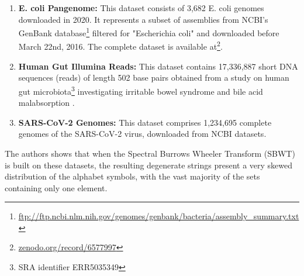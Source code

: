 \begin{enumerate}
    \item \textbf{E. coli Pangenome:} This dataset consists of 3,682 E. coli genomes downloaded in 2020. It represents a subset of assemblies from NCBI's GenBank database\footnote{\url{ftp://ftp.ncbi.nlm.nih.gov/genomes/genbank/bacteria/assembly\_summary.txt}} filtered for "Escherichia coli" and downloaded before March 22nd, 2016. The complete dataset is available at\footnote{\url{zenodo.org/record/6577997}}.
    \item \textbf{Human Gut Illumina Reads:} This dataset contains 17,336,887 short DNA sequences (reads) of length 502 base pairs obtained from a study on human gut microbiota\footnote{SRA identifier ERR5035349} investigating irritable bowel syndrome and bile acid malabsorption \cite{jeffery2020differences}.
    \item \textbf{SARS-CoV-2 Genomes:} This dataset comprises 1,234,695 complete genomes of the SARS-CoV-2 virus, downloaded from NCBI datasets.
\end{enumerate}

\noindent The authors shows that when the Spectral Burrows Wheeler Transform (SBWT) is built on these datasets, the resulting degenerate strings present a very skewed distribution of the alphabet symbols, with the vast majority of the sets containing only one element.
